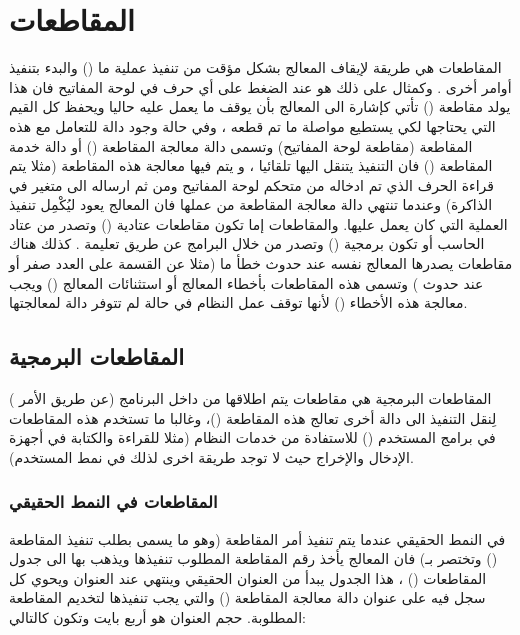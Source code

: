 \documentclass[document.tex]{subfiles}
\begin{document}
\chapter{المقاطعات }
المقاطعات هي طريقة لإيقاف المعالج بشكل مؤقت من تنفيذ عملية ما () والبدء بتنفيذ أوامر أخرى . وكمثال على ذلك هو عند الضغط على أي حرف في لوحة المفاتيح فان هذا يولد مقاطعة () تأتي كإشارة الى المعالج بأن يوقف ما يعمل عليه حاليا ويحفظ كل القيم التي يحتاجها لكي يستطيع مواصلة ما تم قطعه ، وفي حالة وجود دالة للتعامل مع هذه المقاطعة (مقاطعة لوحة المفاتيح) وتسمى دالة معالجة المقاطعة () أو دالة خدمة المقاطعة () فان التنفيذ يتنقل اليها تلقائيا ، و يتم فيها معالجة هذه المقاطعة (مثلا يتم قراءة الحرف الذي تم ادخاله من متحكم لوحة المفاتيح ومن ثم ارساله الى متغير في الذاكرة) وعندما تنتهي دالة معالجة المقاطعة من عملها فان المعالج يعود ليُكْمِل تنفيذ العملية التي كان يعمل عليها. والمقاطعات إما تكون مقاطعات عتادية () وتصدر من عتاد الحاسب أو تكون برمجية () وتصدر من خلال البرامج عن طريق تعليمة . كذلك هناك مقاطعات يصدرها المعالج نفسه عند حدوث خطأ ما (مثلا عن القسمة على العدد صفر أو عند حدوث ) وتسمى هذه المقاطعات بأخطاء المعالج أو استثنائات المعالج () ويجب معالجة هذه الأخطاء () لأنها توقف عمل النظام في حالة لم تتوفر دالة لمعالجتها.


\section{المقاطعات البرمجية }
المقاطعات البرمجية هي مقاطعات يتم اطلاقها من داخل البرنامج (عن طريق الأمر ) لِنقل التنفيذ الى دالة أخرى تعالج هذه المقاطعة ()، وغالبا ما تستخدم هذه المقاطعات في برامج المستخدم () للاستفادة من خدمات النظام (مثلا للقراءة والكتابة في أجهزة الإدخال والإخراج حيث لا توجد طريقة اخرى لذلك في نمط المستخدم).

\subsection{المقاطعات في النمط الحقيقي}
في النمط الحقيقي عندما يتم تنفيذ أمر المقاطعة (وهو ما يسمى بطلب تنفيذ المقاطعة () وتختصر بـ)  فان المعالج يأخذ رقم المقاطعة المطلوب تنفيذها ويذهب بها الى جدول المقاطعات () ، هذا الجدول يبدأ من العنوان الحقيقي  وينتهي عند العنوان  ويحوي كل سجل فيه على عنوان دالة معالجة المقاطعة () والتي يجب تنفيذها لتخديم المقاطعة المطلوبة. حجم العنوان هو أربع بايت وتكون كالتالي:
\end{document}

